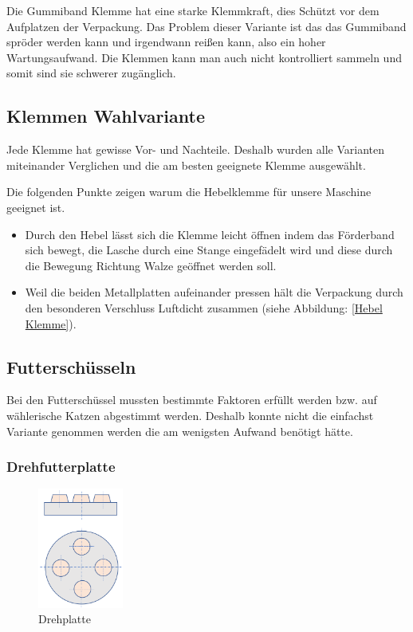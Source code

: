 Die Gummiband Klemme hat eine starke Klemmkraft, dies Schützt vor dem Aufplatzen der Verpackung. Das Problem dieser Variante ist das das Gummiband spröder werden kann und irgendwann reißen kann, also ein hoher Wartungsaufwand. Die Klemmen kann man auch nicht kontrolliert sammeln und somit sind sie schwerer zugänglich.

\subsection{Klemmen Wahlvariante}

Jede Klemme hat gewisse Vor- und Nachteile. Deshalb wurden alle Varianten miteinander Verglichen und die am besten geeignete Klemme ausgewählt.

Die folgenden Punkte zeigen warum die Hebelklemme für unsere Maschine geeignet ist.

\begin{itemize}
\item Durch den Hebel lässt sich die Klemme leicht öffnen indem das Förderband sich bewegt, die Lasche durch eine Stange eingefädelt wird und diese durch die Bewegung Richtung Walze geöffnet werden soll.
\item Weil die beiden Metallplatten aufeinander pressen hält die Verpackung durch den besonderen Verschluss Luftdicht zusammen (siehe Abbildung: \ref{Hebel Klemme}). 

\end{itemize} 

\subsection{Futterschüsseln}

Bei den Futterschüssel mussten bestimmte Faktoren erfüllt werden bzw. auf wählerische Katzen abgestimmt werden. Deshalb konnte nicht die einfachst Variante genommen werden die am wenigsten Aufwand benötigt hätte. 

\subsubsection{Drehfutterplatte}

\begin{figure}
\vspace{-40pt}
  \begin{center}
    \includegraphics[width=0.25\textwidth]{Bilder/Powerpoint/Drehplatte}
  \end{center}
  \caption{Drehplatte}
  \label{Drehplatte}
  \vspace{-20pt}
\end{figure}

